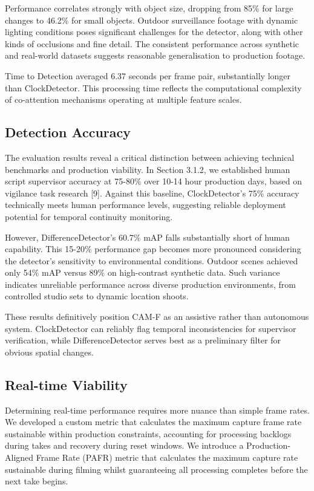 Performance correlates strongly with object size, dropping from 85\% for large changes to 46.2\% for small objects. Outdoor surveillance footage with dynamic lighting conditions poses significant challenges for the detector, along with other kinds of occlusions and fine detail. The consistent performance across synthetic and real-world datasets suggests reasonable generalisation to production footage.

Time to Detection averaged 6.37 seconds per frame pair, substantially longer than ClockDetector. This processing time reflects the computational complexity of co-attention mechanisms operating at multiple feature scales.

\subsection{Detection Accuracy}
The evaluation results reveal a critical distinction between achieving technical benchmarks and production viability. In Section 3.1.2, we established human script supervisor accuracy at 75-80\% over 10-14 hour production days, based on vigilance task research [9]. Against this baseline, ClockDetector's 75\% accuracy technically meets human performance levels, suggesting reliable deployment potential for temporal continuity monitoring.

However, DifferenceDetector's 60.7\% mAP falls substantially short of human capability. This 15-20\% performance gap becomes more pronounced considering the detector's sensitivity to environmental conditions. Outdoor scenes achieved only 54\% mAP versus 89\% on high-contrast synthetic data. Such variance indicates unreliable performance across diverse production environments, from controlled studio sets to dynamic location shoots.

These results definitively position CAM-F as an assistive rather than autonomous system. ClockDetector can reliably flag temporal inconsistencies for supervisor verification, while DifferenceDetector serves best as a preliminary filter for obvious spatial changes.

\subsection{Real-time Viability}
Determining real-time performance requires more nuance than simple frame rates. We developed a custom metric that calculates the maximum capture frame rate sustainable within production constraints, accounting for processing backlogs during takes and recovery during reset windows. We introduce a Production-Aligned Frame Rate (PAFR) metric that calculates the maximum capture rate sustainable during filming whilst guaranteeing all processing completes before the next take begins.

